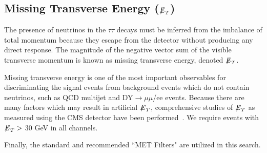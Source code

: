 \subsection{\texorpdfstring{Missing Transverse Energy (${\not\mathrel{E}}_T$)}{Missing transverse energy}}\label{ss:met}

The presence of neutrinos in the $\tau\tau$ decays must be inferred from the imbalance of total momentum because they escape from the detector without producing 
any direct response. The magnitude of the negative vector sum of the visible transverse momentum is known as missing transverse energy, denoted ${\not\mathrel{E}}_T$.

Missing transverse energy is one of the most important observables for discriminating the signal events from background events which do not contain neutrinos, 
such as QCD multijet and DY$\to\mu\mu$/ee events.
Because there are many factors which may result in artificial ${\not\mathrel{E}}_T$, comprehensive studies of ${\not\mathrel{E}}_T$ as measured using the CMS detector have been 
performed~\cite{MET}. We require events with ${\not\mathrel{E}}_T >$ 30 GeV in all channels.

Finally, the standard and recommended ``MET Filters" are utilized in this search.
